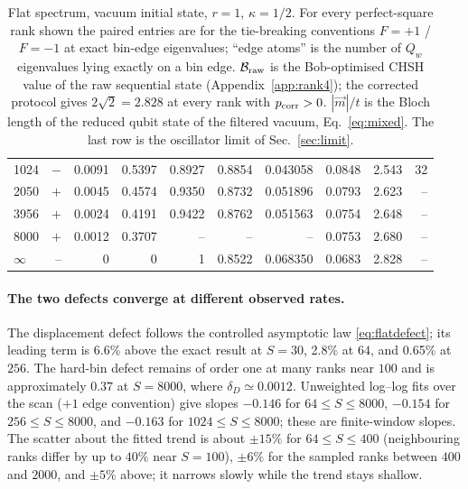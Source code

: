 \documentclass[11pt,a4paper]{article}
\begin{document}
\begin{table}[t]
\begin{tabular}{lrrrrrrrrr}
1024 & $-$ & 0.0091 & 0.5397 & 0.8927 & 0.8854 & 0.043058 & 0.0848 & 2.543 & 32\\
2050 & $+$ & 0.0045 & 0.4574 & 0.9350 & 0.8732 & 0.051896 & 0.0793 & 2.623 & --\\
3956 & $+$ & 0.0024 & 0.4191 & 0.9422 & 0.8762 & 0.051563 & 0.0754 & 2.648 & --\\
8000 & $+$ & 0.0012 & 0.3707 & -- & -- & -- & 0.0753 & 2.680 & --\\
$\infty$ & -- & 0 & 0 & 1 & 0.8522 & 0.068350 & 0.0683 & 2.828 & --\\
\bottomrule
\end{tabular}
\caption{Flat spectrum, vacuum initial state, $r=1$, $\kappa=1/2$. For every perfect-square rank shown the paired entries are for the tie-breaking conventions $F=+1$ / $F=-1$ at exact bin-edge eigenvalues; ``edge atoms'' is the number of $Q_w$ eigenvalues lying exactly on a bin edge. $\mathcal B_{\rm raw}$ is the Bob-optimised CHSH value of the raw sequential state (Appendix~\ref{app:rank4}); the corrected protocol gives $2\sqrt2=2.828$ at every rank with $p_{\rm corr}>0$. $|\vec m|/t$ is the Bloch length of the reduced qubit state of the filtered vacuum, Eq.~\eqref{eq:mixed}. The last row is the oscillator limit of Sec.~\ref{sec:limit}.}
\label{tab:scan}
\end{table}

\paragraph{The two defects converge at different observed rates.}
The displacement defect follows the controlled asymptotic law \eqref{eq:flatdefect}; its leading term is 6.6\% above the exact result at $S=30$, 2.8\% at $64$, and 0.65\% at $256$. The hard-bin defect remains of order one at many ranks near $100$ and is approximately $0.37$ at $S=8000$, where $\delta_D\simeq0.0012$. Unweighted log--log fits over the scan ($+1$ edge convention) give slopes $-0.146$ for $64\le S\le8000$, $-0.154$ for $256\le S\le8000$, and $-0.163$ for $1024\le S\le8000$; these are finite-window slopes. The scatter about the fitted trend is about $\pm15\%$ for $64\le S\le400$ (neighbouring ranks differ by up to $40\%$ near $S=100$), $\pm6\%$ for the sampled ranks between $400$ and $2000$, and $\pm5\%$ above; it narrows slowly while the trend stays shallow.
\end{document}
